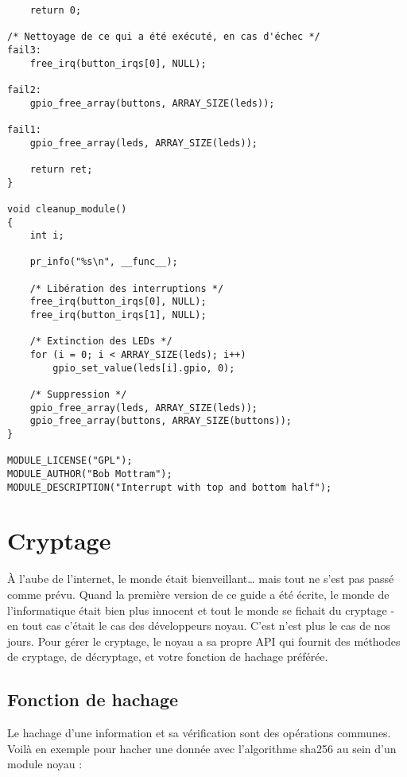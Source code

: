 \documentclass[11pt]{article}
\begin{document}
\begin{verbatim}
    return 0;

/* Nettoyage de ce qui a été exécuté, en cas d'échec */
fail3:
    free_irq(button_irqs[0], NULL);

fail2:
    gpio_free_array(buttons, ARRAY_SIZE(leds));

fail1:
    gpio_free_array(leds, ARRAY_SIZE(leds));

    return ret;
}

void cleanup_module()
{
    int i;

    pr_info("%s\n", __func__);

    /* Libération des interruptions */
    free_irq(button_irqs[0], NULL);
    free_irq(button_irqs[1], NULL);

    /* Extinction des LEDs */
    for (i = 0; i < ARRAY_SIZE(leds); i++)
        gpio_set_value(leds[i].gpio, 0);

    /* Suppression */
    gpio_free_array(leds, ARRAY_SIZE(leds));
    gpio_free_array(buttons, ARRAY_SIZE(buttons));
}

MODULE_LICENSE("GPL");
MODULE_AUTHOR("Bob Mottram");
MODULE_DESCRIPTION("Interrupt with top and bottom half");
\end{verbatim}

\section*{Cryptage}
\label{sec-16}

À l'aube de l'internet, le monde était bienveillant\ldots{} mais tout ne s'est pas passé comme prévu. Quand la première version de ce guide a été écrite, le monde de l'informatique était bien plus innocent et tout le monde se fichait du cryptage - en tout cas c'était le cas des développeurs noyau. C'est n'est plus le cas de nos jours. Pour gérer le cryptage, le noyau a sa propre API qui fournit des méthodes de cryptage, de décryptage, et votre fonction de hachage préférée.

\subsection*{Fonction de hachage}
\label{sec-16-1}

Le hachage d'une information et sa vérification sont des opérations communes. Voilà en exemple pour hacher une donnée avec l'algorithme sha256 au sein d'un module noyau :
\end{document}
